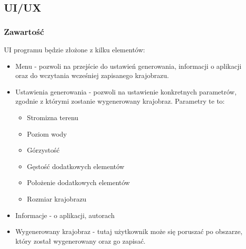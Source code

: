 \documentclass[12pt,a4paper]{article}
\begin{document}
\subsection{UI/UX}
\subsubsection{Zawartość}
UI programu będzie złożone z kilku elementów:
\begin{itemize}
\item Menu - pozwoli na przejście do ustawień generowania, informacji o aplikacji oraz do wczytania wcześniej zapisanego krajobrazu.
\item Ustawienia generowania - pozwoli na ustawienie konkretnych parametrów, zgodnie z którymi zostanie wygenerowany krajobraz. Parametry te to: 
	\begin{itemize}
	\item Stromizna terenu
	\item Poziom wody
	\item Górzystość
	\item Gęstość dodatkowych elementów
	\item Położenie dodatkowych elementów
	\item Rozmiar krajobrazu
	\end{itemize}
	\item Informacje - o aplikacji, autorach
	\item Wygenerowany krajobraz - tutaj użytkownik może się poruszać po obszarze, który został wygenerowany oraz go zapisać.
\end{itemize}
\end{document}
